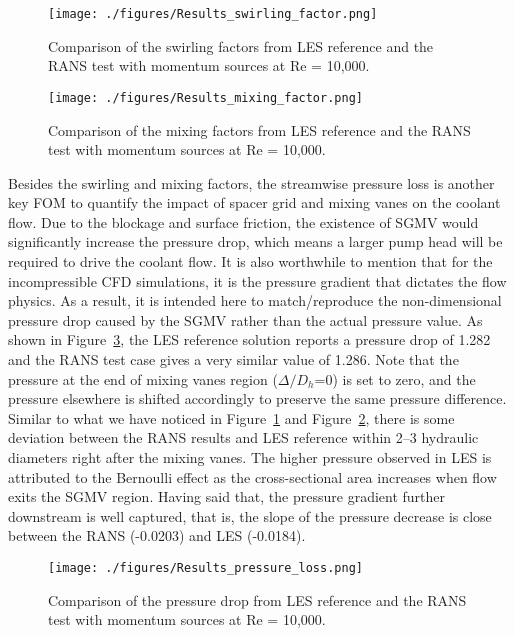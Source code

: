 \begin{figure}[!ht]
\centering
\texttt{[image: ./figures/Results\_swirling\_factor.png]}
\caption{Comparison of the swirling factors from LES reference and the RANS test with momentum sources at Re = 10,000.}
\label{fig:fswirl}
\end{figure}

\begin{figure}[!ht]
\centering
\texttt{[image: ./figures/Results\_mixing\_factor.png]}
\caption{Comparison of the mixing factors from LES reference and the RANS test with momentum sources at Re = 10,000.}
\label{fig:fmix}
\end{figure}

Besides the swirling and mixing factors, the streamwise pressure loss is another key FOM to quantify the impact of spacer grid and mixing vanes on the coolant flow.
Due to the blockage and surface friction, the existence of SGMV would significantly increase the pressure drop, which means a larger pump head will be required to drive the coolant flow.
It is also worthwhile to mention that for the incompressible CFD simulations, it is the pressure gradient that dictates the flow physics.
As a result, it is intended here to match/reproduce the non-dimensional pressure drop caused by the SGMV rather than the actual pressure value.
As shown in Figure~\ref{fig:presloss}, the LES reference solution reports a pressure drop of 1.282 and the RANS test case gives a very similar value of 1.286.
Note that the pressure at the end of mixing vanes region ($\Delta/D_h$=0) is set to zero, and the pressure elsewhere is shifted accordingly to preserve the same pressure difference.
Similar to what we have noticed in Figure~\ref{fig:fswirl} and Figure~\ref{fig:fmix}, there is some deviation between the RANS results and LES reference within 2--3 hydraulic diameters right after the mixing vanes.
The higher pressure observed in LES is attributed to the Bernoulli effect as the cross-sectional area increases when flow exits the SGMV region.
 Having said that, the pressure gradient further downstream is well captured, that is, the slope of the pressure decrease is close between the RANS (-0.0203) and LES (-0.0184).

\begin{figure}[!ht]
\centering
\texttt{[image: ./figures/Results\_pressure\_loss.png]}
\caption{Comparison of the pressure drop from LES reference and the RANS test with momentum sources at Re = 10,000.}
\label{fig:presloss}
\end{figure}


